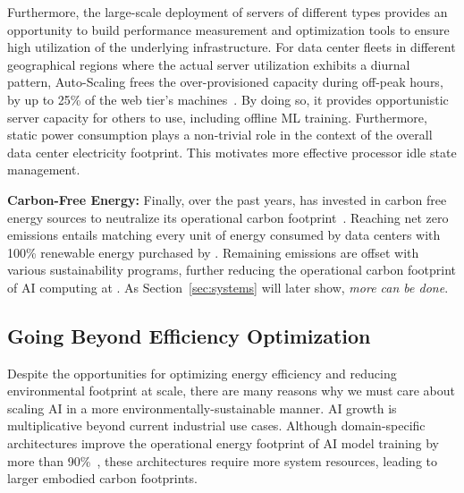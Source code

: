 Furthermore, the large-scale deployment of servers of different types provides an opportunity to build performance measurement and optimization tools to ensure high utilization of the underlying infrastructure. For data center fleets in different geographical regions where the actual server utilization exhibits a diurnal pattern, Auto-Scaling frees the over-provisioned capacity during off-peak hours, by up to 25\% of the web tier’s machines~\cite{Tang:osdi:2020}. By doing so, it provides opportunistic server capacity for others to use, including offline ML training. Furthermore, static power consumption plays a non-trivial role in the context of the overall data center electricity footprint. This motivates more effective processor idle state management.


\textbf{Carbon-Free Energy:} Finally, over the past years, \fb has invested in carbon free energy sources to neutralize its operational carbon footprint~\cite{facebook-sustainability-report}. 
Reaching net zero emissions entails matching every unit of energy consumed by data centers with 100\% renewable energy purchased by \fb. Remaining emissions are offset with various sustainability programs, further reducing the operational carbon footprint of AI computing at \fb. As Section~\ref{sec:systems} will later show, \textit{more can be done}.  



\subsection{Going Beyond Efficiency Optimization}

Despite the opportunities for optimizing energy efficiency and reducing environmental footprint at scale, there are many reasons why we must care about scaling AI in a more environmentally-sustainable manner. AI growth is multiplicative beyond current industrial use cases. Although domain-specific architectures improve the operational energy footprint of AI model training by more than 90\%~\cite{Patterson:arxiv:2021}, these architectures require more system resources, leading to larger embodied carbon footprints.


